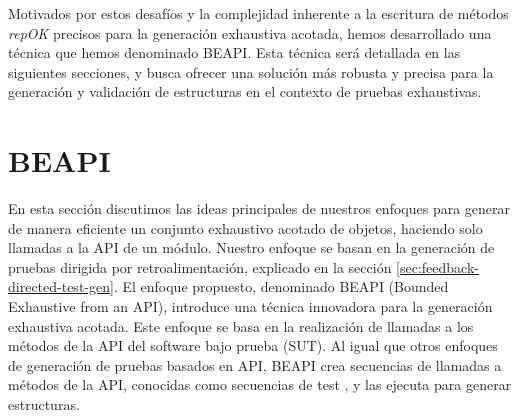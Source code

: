 Motivados por estos desafíos y la complejidad inherente a la escritura de métodos \emph{repOK} precisos para la generación exhaustiva acotada, hemos desarrollado una técnica que hemos denominado BEAPI. 
Esta técnica será detallada en las siguientes secciones, y busca ofrecer una solución más robusta y precisa para la generación y validación de estructuras en el contexto de pruebas exhaustivas.


\section[BEAPI]{BEAPI}
\label{sec:beapiIntro}
En esta sección discutimos las ideas principales de nuestros enfoques para generar de manera eficiente un conjunto exhaustivo acotado de objetos, haciendo solo llamadas a la API de un módulo. Nuestro enfoque se basan en la generación de pruebas dirigida por retroalimentación, explicado en la sección \ref{sec:feedback-directed-test-gen}.
El enfoque propuesto, denominado \textsf{BEAPI} (Bounded Exhaustive from an API), introduce una técnica innovadora para la generación exhaustiva acotada. Este enfoque se basa en la realización de llamadas a los métodos de la API del software bajo prueba (SUT). Al igual que otros enfoques de generación de pruebas basados en API, \textsf{BEAPI} crea secuencias de llamadas a métodos de la API, conocidas como secuencias de test \cite{Ammann16}, y las ejecuta para generar estructuras. 





